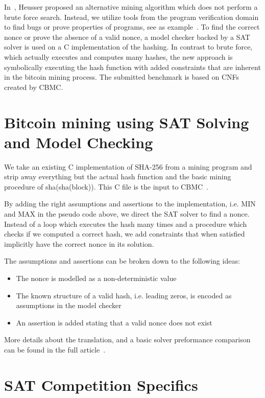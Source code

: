\documentclass[conference]{IEEEtran}
\begin{document}
In~\cite{satcoin-online-article}, Heusser proposed an alternative mining algorithm which does not perform a brute force search.
Instead, we utilize tools from the program verification domain to find bugs or prove properties of programs, see as example~\cite{Heusser:2010:QIL:1920261.1920300}.
To find the correct nonce or prove the absence of a valid nonce, a model checker backed by a SAT solver is used on a C implementation of the hashing.
In contrast to brute force, which actually executes and computes many hashes, the new approach is symbolically executing the hash function with
added constraints that are inherent in the bitcoin mining process.
The submitted benchmark is based on CNFs created by CBMC.
    
\section{Bitcoin mining using SAT Solving and Model Checking}

We take an existing C implementation of SHA-256 from a mining program and strip away everything but the actual hash function and the basic mining procedure of sha(sha(block)).
This C file is the input to CBMC~\cite{DBLP:conf/tacas/KroeningT14}.

By adding the right assumptions and assertions to the implementation, i.e. MIN and MAX in the pseudo code above, we direct the SAT solver to find a nonce.
Instead of a loop which executes the hash many times and a procedure which checks if we computed a correct hash,
we add constraints that when satisfied implicitly have the correct nonce in its solution.

The assumptions and assertions can be broken down to the following ideas:
% 
\begin{itemize}
 \item The nonce is modelled as a non-deterministic value
 \item The known structure of a valid hash, i.e. leading zeros, is encoded as assumptions in the model checker
 \item An assertion is added stating that a valid nonce does not exist 
\end{itemize}
% 
More details about the translation, and a basic solver preformance comparison can be found in the full article~\cite{satcoin-online-article}.

\section{SAT Competition Specifics}
\end{document}

